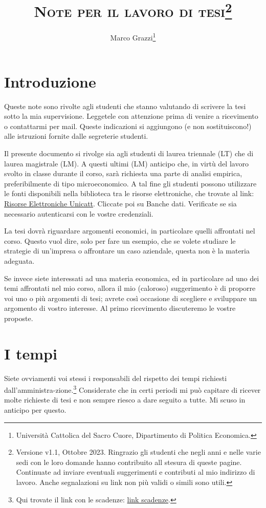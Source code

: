 \documentclass[12pt]{article}
\title{ \textsc{Note per il lavoro di tesi}\thanks{Versione v1.1,
    Ottobre 2023. Ringrazio gli studenti che negli anni e nelle varie
    sedi con le loro domande hanno contribuito all stesura di queste
    pagine. Continuate ad inviare eventuali suggerimenti e contributi
    al mio indirizzo di lavoro. Anche segnalazioni su link non pi\`u
    validi o simili sono utili.}}
\author{Marco Grazzi\thanks{Universit\`a Cattolica del Sacro Cuore, Dipartimento di Politica Economica.}}
\date{\empty}
\begin{document}
\maketitle





\section{Introduzione}\label{sec:intro}

Queste note sono rivolte agli studenti che stanno valutando di
scrivere la tesi sotto la mia supervisione. Leggetele con attenzione
prima di venire a ricevimento o contattarmi per mail. Queste
indicazioni si aggiungono (e non sostituiscono!) alle istruzioni
fornite dalle segreterie studenti.

Il presente documento si rivolge sia agli studenti di laurea triennale
(LT) che di laurea magistrale (LM). A questi ultimi (LM) anticipo che,
in virt\`u del lavoro svolto in classe durante il corso, sar\`a
richiesta una parte di analisi empirica, preferibilmente di tipo
microeconomico. A tal fine gli studenti possono utilizzare le fonti
disponibili nella biblioteca tra le risorse elettroniche, che trovate
al link:
\href{https://biblioteche.unicatt.it/brescia-servizi-per-utenti-interni-ricerche-bibliografiche-e-banche-dati}{Risorse
  Elettroniche Unicatt}. Cliccate poi su Banche dati. Verificate se
sia necessario autenticarsi con le vostre credenziali.


La tesi dovr\`a riguardare argomenti economici, in particolare quelli
affrontati nel corso. Questo vuol dire, solo per fare un esempio, che
se volete studiare le strategie di un'impresa o affrontare un caso
aziendale, questa non \`e la materia adeguata.

Se invece siete interessati ad una materia economica, ed in
particolare ad uno dei temi affrontati nel mio corso, allora il mio
(caloroso) suggerimento \`e di proporre voi uno o pi\`u argomenti di
tesi; avrete cos\`i occasione di scegliere e sviluppare un argomento di
vostro interesse. Al primo ricevimento discuteremo le vostre proposte.



\section{I tempi}
Siete ovviamenti voi stessi i responsabili del rispetto dei tempi
richiesti dall'amministra-zione.\footnote{Qui trovate il link con le
  scadenze:
  \href{https://milano.unicatt.it/facolta/economia-informazioni-per-gli-studenti-esami-di-laurea-294}{link
    scadenze}. } Considerate che in certi periodi mi pu\`o capitare di
ricever molte richieste di tesi e non sempre riesco a dare seguito a
tutte. Mi scuso in anticipo per questo.
\end{document}
